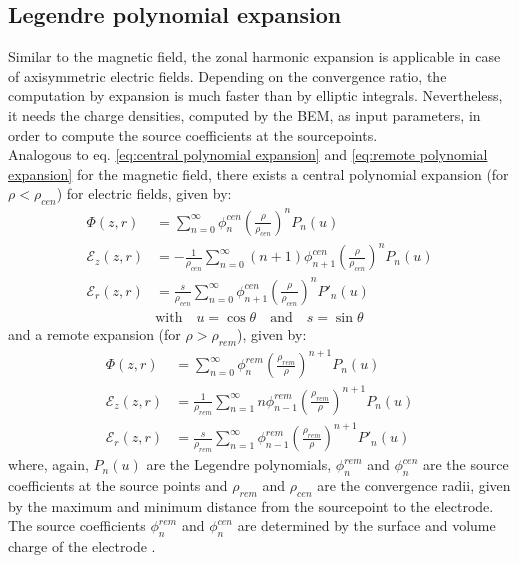 	\subsection{Legendre polynomial expansion}
	  Similar to the magnetic field, the zonal harmonic expansion is applicable in case of axisymmetric electric fields. Depending on the convergence ratio, the computation by expansion is much faster than by elliptic integrals. Nevertheless, it needs the charge densities, computed by the BEM, as input parameters, in order to compute the source coefficients at the sourcepoints. \\
	  Analogous to eq. \eqref{eq:central polynomial expansion} and \eqref{eq:remote polynomial expansion} for the magnetic field, there exists a central polynomial expansion (for $\rho < \rho_{cen}$) for electric fields, given by:
	  \begin{equation}
	    \begin{aligned}
		\Phi (z,r) &= \sum_{n=0}^{\infty} \phi_{n}^{cen} \left(\frac{\rho}{\rho_{cen}}\right)^{n}P_n(u) \\
		\mathcal{E}_{z}(z,r) &= -\frac{1}{\rho_{cen}} \sum_{n=0}^{\infty}(n+1) \phi_{n+1}^{cen} \left(\frac{\rho}{\rho_{cen}}\right)^{n}P_n(u) \\
		\mathcal{E}_{r}(z,r) &= \frac{s}{\rho_{cen}} \sum_{n=0}^{\infty} \phi_{n+1}^{cen} \left(\frac{\rho}{\rho_{cen}}\right)^{n}P'_n(u) \\
		&\text{with} \quad u = \cos\theta \quad \text{and} \quad s = \sin\theta
	    \end{aligned}
	    \label{eq:central polynomial expansion electric field}
	  \end{equation}
	  and a remote expansion (for $\rho > \rho_{rem}$), given by:
	  \begin{equation}
	    \begin{aligned}
		\Phi (z,r)&= \sum_{n=0}^{\infty} \phi_{n}^{rem} \left(\frac{\rho_{rem}}{\rho}\right)^{n+1}P_n(u) \\
		\mathcal{E}_{z}(z,r) &= \frac{1}{\rho_{rem}} \sum_{n=1}^{\infty}n \phi_{n-1}^{rem} \left(\frac{\rho_{rem}}{\rho}\right)^{n+1}P_n(u) \\
		\mathcal{E}_{r} (z,r)&= \frac{s}{\rho_{rem}} \sum_{n=1}^{\infty} \phi_{n-1}^{rem} \left(\frac{\rho_{rem}}{\rho}\right)^{n+1}P'_n(u) %
	    \end{aligned}
	  \label{eq:remote polynomial expansion electric field}
	  \end{equation}
	  where, again, $P_n(u)$ are the Legendre polynomials, $\phi_{n}^{rem}$ and $\phi_{n}^{cen}$ are the source coefficients at the source points and $\rho_{rem}$ and $\rho_{cen}$ are the convergence radii, given by the maximum and minimum distance from the sourcepoint to the electrode. The source coefficients $\phi_{n}^{rem}$ and $\phi_{n}^{cen}$ are determined by the surface and volume charge of the electrode \cite{Glueck2009}.
